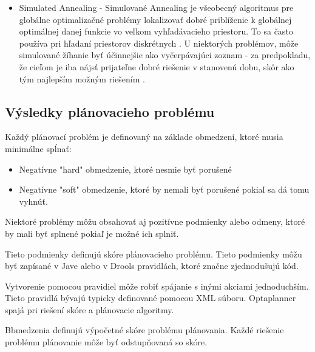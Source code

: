 \begin{itemize}
\begin{itemize}
\item Simulated Annealing - Simulované Annealing je všeobecný algoritmus pre globálne optimalizačné problémy lokalizovať dobré priblíženie k globálnej optimálnej danej funkcie vo veľkom vyhľadávacieho priestoru. To sa často používa pri hľadaní priestorov diskrétnych . U niektorých problémov, môže simulované žíhanie byť účinnejšie ako vyčerpávajúci zoznam - za predpokladu, že cieľom je iba nájsť prijateľne dobré riešenie v stanovenú dobu, skôr ako tým najlepším možným riešením .

\end{itemize}

\end{itemize}






\subsection{Výsledky plánovacieho problému}


Každý plánovací problém je definovaný na základe obmedzení, ktoré musia minimálne spĺnať: \cite{optabook}
\begin{itemize}
\item Negatívne "hard" obmedzenie, ktoré nesmie byť porušené
\item Negatívne "soft" obmedzenie, ktoré by nemali byť porušené pokiaľ sa dá tomu vyhnúť.
\end{itemize}

Niektoré problémy môžu obsahovať aj pozitívne podmienky alebo odmeny, ktoré by mali byť splnené pokiaľ je možné ich splniť.

Tieto podmienky definujú skóre plánovacieho problému. Tieto podmienky môžu byť zapísané v Jave alebo v Drools pravidlách, ktoré značne zjednodušujú kód.

 Vytvorenie pomocou pravidiel  môže robiť  spájanie s inými akciami jednoduchším. Tieto pravidlá bývajú typicky definované pomocou XML súboru.
Optaplanner spajá pri riešení skóre a plánovacie algoritmy.




Bbmedzenia definujú výpočetné skóre problému plánovania. Každé riešenie problému plánovanie môže byť odstupňovaná so skóre. 

